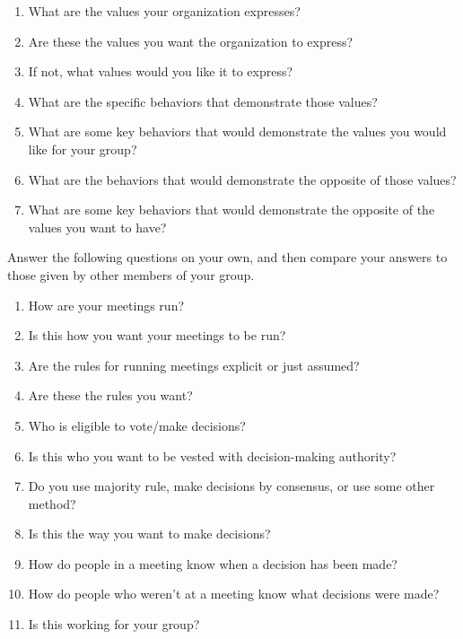 \begin{enumerate}

\item
  What are the values your organization expresses?

\item
  Are these the values you want the organization to express?

\item
  If not, what values would you like it to express?

\item
  What are the specific behaviors that demonstrate those values?

\item
  What are some key behaviors that would demonstrate the values you
  would like for your group?

\item
  What are the behaviors that would demonstrate the opposite of those
  values?

\item
  What are some key behaviors that would demonstrate the opposite of the
  values you want to have?

\end{enumerate}


Answer the following questions on your own, and then compare your
answers to those given by other members of your group.

\begin{enumerate}

\item
  How are your meetings run?

\item
  Is this how you want your meetings to be run?

\item
  Are the rules for running meetings explicit or just assumed?

\item
  Are these the rules you want?

\item
  Who is eligible to vote/make decisions?

\item
  Is this who you want to be vested with decision-making authority?

\item
  Do you use majority rule, make decisions by consensus, or use some
  other method?

\item
  Is this the way you want to make decisions?

\item
  How do people in a meeting know when a decision has been made?

\item
  How do people who weren't at a meeting know what decisions were made?

\item
  Is this working for your group?

\end{enumerate}

